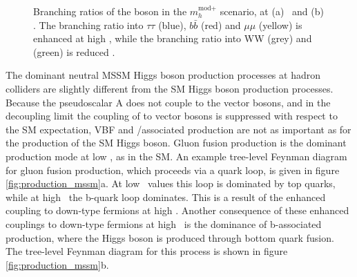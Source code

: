 \begin{figure}[h!]
\begin{center}
\end{center}
\caption{Branching ratios of the \PHiggs boson in the $m_{h}^{\text{mod+}}$ scenario,
at (a) ~and (b) . The branching ratio into $\tau\tau$ (blue), $b\bar{b}$ (red) 
and $\mu\mu$ (yellow) is enhanced at high \tanb, while the branching ratio into 
WW (grey) and \ttbar (green) is reduced \cite{MSSM-xswg-twiki}.}
\label{fig:mssm_brtautau}
\end{figure}

The dominant neutral MSSM Higgs boson production processes at hadron colliders
are slightly different from the \ac{SM} Higgs boson production processes. 
Because the pseudoscalar A does not couple to the
vector bosons, and in the decoupling limit the coupling of \PHiggs to vector
bosons is suppressed with respect to the \ac{SM} expectation, VBF and \PW/\PZ associated
production are not as important as for the production of the \ac{SM} Higgs boson. Gluon fusion production is 
the dominant production mode at low \tanb, as in the \ac{SM}. 
An example tree-level Feynman diagram for gluon fusion production, which proceeds via
a quark loop, is given in figure \ref{fig:production_mssm}a.
At low \tanb~values this loop is dominated by top quarks, while at 
high \tanb~the b-quark loop dominates. This is a result of the enhanced coupling to down-type fermions at high \tanb. 
Another consequence of these enhanced couplings to down-type fermions at high \tanb~is the dominance of b-associated production, where the Higgs boson is produced through
bottom quark fusion. The tree-level Feynman diagram for this process is shown in figure \ref{fig:production_mssm}b.

